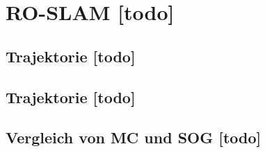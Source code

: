 \section{RO-SLAM [todo]}


\begin{comment}
--------------------------------------------------------------------------------
\end{comment}
\subsection{Trajektorie [todo]}


\begin{comment}
--------------------------------------------------------------------------------
\end{comment}
\subsection{Trajektorie [todo]}


\begin{comment}
--------------------------------------------------------------------------------
\end{comment}
\subsection{Vergleich von MC und SOG [todo]}

